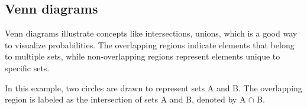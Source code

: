 \documentclass{article}
\begin{document}
\subsection{Venn diagrams}
\begin{minipage}{0.65\textwidth}
    Venn diagrams illustrate concepts like intersections, unions, which is a good way to visualize probabilities. The overlapping regions indicate elements that belong to multiple sets, while non-overlapping regions represent elements unique to specific sets.

    In this example, two circles are drawn to represent sets A and B. The overlapping region is labeled as the intersection of sets A and B, denoted by A $\cap$ B.
\end{minipage}
\hfill
\begin{minipage}{0.3\textwidth}
\end{minipage}
\end{document}
